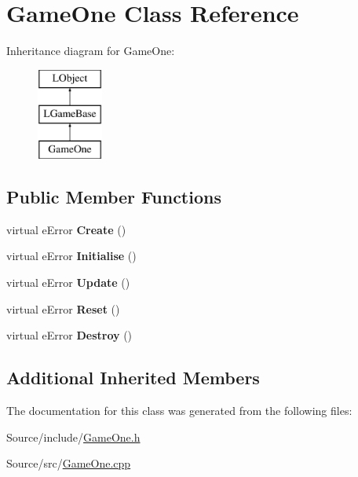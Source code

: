 \hypertarget{class_game_one}{\section{Game\-One Class Reference}
\label{class_game_one}
}
Inheritance diagram for Game\-One\-:\begin{figure}[H]
\begin{center}
\leavevmode
\includegraphics[height=3.000000cm]{class_game_one}
\end{center}
\end{figure}
\subsection*{Public Member Functions}
\begin{DoxyCompactItemize}
\item 
\hypertarget{class_game_one_a76590917f2525e502798d3a8b1916303}{virtual e\-Error {\bfseries Create} ()}\label{class_game_one_a76590917f2525e502798d3a8b1916303}

\item 
\hypertarget{class_game_one_accbd99a0a216c5e2437ffa89d698f356}{virtual e\-Error {\bfseries Initialise} ()}\label{class_game_one_accbd99a0a216c5e2437ffa89d698f356}

\item 
\hypertarget{class_game_one_ac389e6f73fe47ecff5db0b6c5b6b53e1}{virtual e\-Error {\bfseries Update} ()}\label{class_game_one_ac389e6f73fe47ecff5db0b6c5b6b53e1}

\item 
\hypertarget{class_game_one_a51bff7285daf69d4ceffa88313cd9ebf}{virtual e\-Error {\bfseries Reset} ()}\label{class_game_one_a51bff7285daf69d4ceffa88313cd9ebf}

\item 
\hypertarget{class_game_one_a0fb2af6516be1647500dc16ae2610630}{virtual e\-Error {\bfseries Destroy} ()}\label{class_game_one_a0fb2af6516be1647500dc16ae2610630}

\end{DoxyCompactItemize}
\subsection*{Additional Inherited Members}


The documentation for this class was generated from the following files\-:\begin{DoxyCompactItemize}
\item 
Source/include/\hyperlink{_game_one_8h}{Game\-One.\-h}\item 
Source/src/\hyperlink{_game_one_8cpp}{Game\-One.\-cpp}\end{DoxyCompactItemize}
